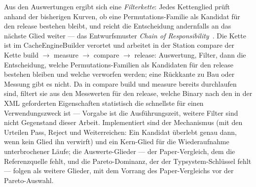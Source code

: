 \begin{nurlang}
Aus den Auswertungen ergibt sich eine \emph{Filterkette}: Jedes Kettenglied prüft anhand der bisherigen
Kurven, ob eine Permutations-Familie als Kandidat für den release bestehen bleibt, und reicht die
Entscheidung andernfalls an das
nächste Glied weiter --- das Entwurfsmuster \emph{Chain of Responsibility}~\cite{gamma1994patterns}. Die
Kette ist im CacheEngineBuilder verortet und arbeitet in der Station compare der Kette build $\to$ measure
$\to$ compare $\to$ release: Auswertung, Filter, dann die Entscheidung, welche Permutations-Familien
als Kandidaten für den release bestehen bleiben und welche verworfen werden;
eine Rückkante zu Bau oder Messung gibt es nicht. Da in compare
build und measure bereits durchlaufen sind, filtert sie aus den Messwerten für den release,
welche Binary nach den in der XML geforderten Eigenschaften statistisch die schnellste für einen
Verwendungszweck ist --- Vorgabe ist die Ausführungszeit, weitere Filter sind nicht Gegenstand dieser
Arbeit. Implementiert sind der Mechanismus (mit den Urteilen Pass, Reject und Weiterreichen: Ein
Kandidat überlebt genau dann, wenn kein Glied ihn verwirft) und ein Kern-Glied für die Wiederaufnahme
unterbrochener Läufe; die Auswerte-Glieder --- der Paper-Vergleich, dem die Referenzquelle fehlt, und
die Pareto-Dominanz, der der Typsystem-Schlüssel fehlt --- folgen als weitere Glieder, mit dem Vorrang
des Paper-Vergleichs vor der Pareto-Auswahl.


\end{nurlang}

